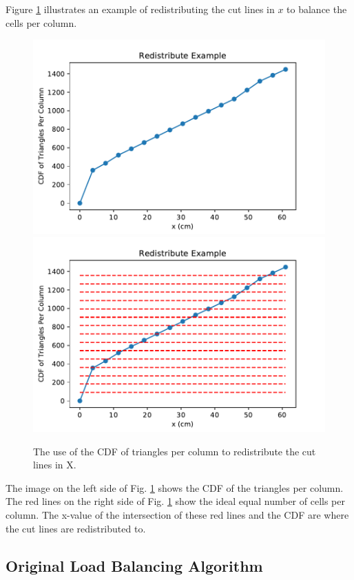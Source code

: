 \documentclass[letterpaper]{mandc2019}
\begin{document}
Figure \ref{redistribute} illustrates an example of redistributing the cut lines in $x$ to balance the cells per column.
\begin{figure}[htb]
\centering
\includegraphics[scale=0.5]{Figures/redistribute_before.pdf}
\includegraphics[scale=0.5]{Figures/redistribute_after.pdf}
\caption{The use of the CDF of triangles per column to redistribute the cut lines in X.}
\label{redistribute}
\end{figure}
The image on the left side of Fig. \ref{redistribute} shows the CDF of the triangles per column. The red lines on the right side of Fig. \ref{redistribute} show the ideal equal number of cells per column. The x-value of the intersection of these red lines and the CDF are where the cut lines are redistributed to. 

\subsection{Original Load Balancing Algorithm}
\label{og_lb}
\end{document}
